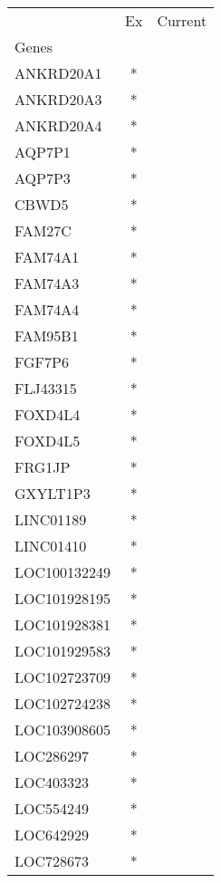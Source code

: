 \begin{tabular}{lcc}
\toprule
{} & Ex & Current \\
Genes              &    &         \\
\midrule
ANKRD20A1          &  * &         \\
ANKRD20A3          &  * &         \\
ANKRD20A4          &  * &         \\
AQP7P1             &  * &         \\
AQP7P3             &  * &         \\
CBWD5              &  * &         \\
FAM27C             &  * &         \\
FAM74A1            &  * &         \\
FAM74A3            &  * &         \\
FAM74A4            &  * &         \\
FAM95B1            &  * &         \\
FGF7P6             &  * &         \\
FLJ43315           &  * &         \\
FOXD4L4            &  * &         \\
FOXD4L5            &  * &         \\
FRG1JP             &  * &         \\
GXYLT1P3           &  * &         \\
LINC01189          &  * &         \\
LINC01410          &  * &         \\
LOC100132249       &  * &         \\
LOC101928195       &  * &         \\
LOC101928381       &  * &         \\
LOC101929583       &  * &         \\
LOC102723709       &  * &         \\
LOC102724238       &  * &         \\
LOC103908605       &  * &         \\
LOC286297          &  * &         \\
LOC403323          &  * &         \\
LOC554249          &  * &         \\
LOC642929          &  * &         \\
LOC728673          &  * &         \\

\end{tabular}
